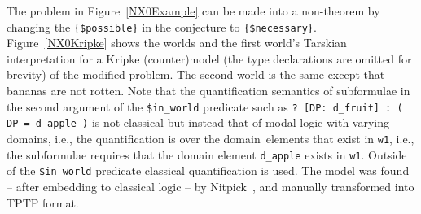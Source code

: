 \documentclass{ceurart}
\begin{document}
The problem in Figure~\ref{NX0Example} can be made into a non-theorem by changing the 
{\tt \{\$possible\}} in the conjecture to {\tt \{\$necessary\}}.
Figure~\ref{NX0Kripke} shows the worlds and the first world's Tarskian interpretation for 
a Kripke (counter)model (the type declarations are omitted for brevity) of the modified problem.
The second world is the same except that bananas are not rotten.
Note that the quantification semantics of subformulae in the second argument of the
{\tt \$in\_world} predicate such as 
{\tt ?\,[DP:\,d\_fruit]\,:\,(\,DP\,=\,d\_apple\,)}
is not classical but instead that of modal logic with varying domains, i.e., the quantification
is over the domain elements that exist in {\tt w1}, i.e., the subformulae requires that
the domain element {\tt d\_apple} exists in {\tt w1}. Outside of the {\tt \$in\_world} predicate
classical quantification is used. 
The model was found -- after embedding to classical logic -- by Nitpick~\cite{BN10-ITP}, and manually transformed into TPTP format.
\end{document}
